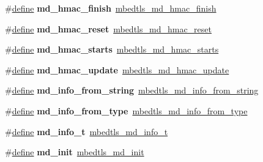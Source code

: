 \begin{DoxyCompactItemize}
\#\hyperlink{structdefine}{define} {\bfseries md\+\_\+hmac\+\_\+finish}~\hyperlink{md_8h_a7aeafef80c89e47ee3033035a6a75a27}{mbedtls\+\_\+md\+\_\+hmac\+\_\+finish}
\item 
\mbox{\label{compat-1_83_8h_ab29d80c549d2f18c098879487a743102}} 
\#\hyperlink{structdefine}{define} {\bfseries md\+\_\+hmac\+\_\+reset}~\hyperlink{md_8h_a3a5c64b5bda0f294e917ccd5a8ca234e}{mbedtls\+\_\+md\+\_\+hmac\+\_\+reset}
\item 
\mbox{\label{compat-1_83_8h_abe3fbd2861bd57a491db2a6aa3832635}} 
\#\hyperlink{structdefine}{define} {\bfseries md\+\_\+hmac\+\_\+starts}~\hyperlink{md_8h_a8968f8659fc277f013374c1bac8d4d1a}{mbedtls\+\_\+md\+\_\+hmac\+\_\+starts}
\item 
\mbox{\label{compat-1_83_8h_a4c134db1c69e0694957a57c7720dc999}} 
\#\hyperlink{structdefine}{define} {\bfseries md\+\_\+hmac\+\_\+update}~\hyperlink{md_8h_a86cbea1c3bcd558a7e185ff8200a29a6}{mbedtls\+\_\+md\+\_\+hmac\+\_\+update}
\item 
\mbox{\label{compat-1_83_8h_aeaf2d3e2150aa01e24f71658fb90dfd7}} 
\#\hyperlink{structdefine}{define} {\bfseries md\+\_\+info\+\_\+from\+\_\+string}~\hyperlink{md_8h_ac4619cce171e558d059baae35da50a2a}{mbedtls\+\_\+md\+\_\+info\+\_\+from\+\_\+string}
\item 
\mbox{\label{compat-1_83_8h_aa785c74f31cd3e49d6cebd5890234de4}} 
\#\hyperlink{structdefine}{define} {\bfseries md\+\_\+info\+\_\+from\+\_\+type}~\hyperlink{md_8h_aca53b51e0c8eb0e07c7eb4a3e6acfa0d}{mbedtls\+\_\+md\+\_\+info\+\_\+from\+\_\+type}
\item 
\mbox{\label{compat-1_83_8h_ab9738ba1e54ac45d2277baeca2037fe7}} 
\#\hyperlink{structdefine}{define} {\bfseries md\+\_\+info\+\_\+t}~\hyperlink{structmbedtls__md__info__t}{mbedtls\+\_\+md\+\_\+info\+\_\+t}
\item 
\mbox{\label{compat-1_83_8h_a9f3fd266e052e304a588a5f0b86f5bf8}} 
\#\hyperlink{structdefine}{define} {\bfseries md\+\_\+init}~\hyperlink{md_8h_ad8b02927ca10552e3cbf293fa8c10e24}{mbedtls\+\_\+md\+\_\+init}
\item 
\mbox{\label{compat-1_83_8h_a54b6d26d991862bcc226493295d83caf}} 

\end{DoxyCompactItemize}
